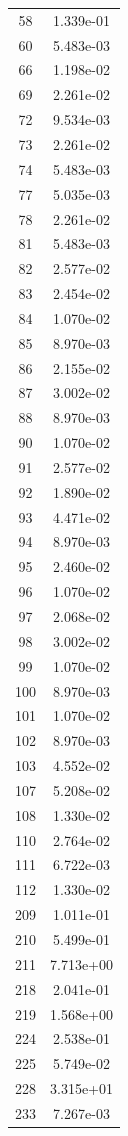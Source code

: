 \documentclass[12pt]{article}
\begin{document}
\begin{longtable}{@{}cc@{}}
58 & 1.339e-01 \\
60 & 5.483e-03 \\
66 & 1.198e-02 \\
69 & 2.261e-02 \\
72 & 9.534e-03 \\
73 & 2.261e-02 \\
74 & 5.483e-03 \\
77 & 5.035e-03 \\
78 & 2.261e-02 \\
81 & 5.483e-03 \\
82 & 2.577e-02 \\
83 & 2.454e-02 \\
84 & 1.070e-02 \\
85 & 8.970e-03 \\
86 & 2.155e-02 \\
87 & 3.002e-02 \\
88 & 8.970e-03 \\
90 & 1.070e-02 \\
91 & 2.577e-02 \\
92 & 1.890e-02 \\
93 & 4.471e-02 \\
94 & 8.970e-03 \\
95 & 2.460e-02 \\
96 & 1.070e-02 \\
97 & 2.068e-02 \\
98 & 3.002e-02 \\
99 & 1.070e-02 \\
100 & 8.970e-03 \\
101 & 1.070e-02 \\
102 & 8.970e-03 \\
103 & 4.552e-02 \\
107 & 5.208e-02 \\
108 & 1.330e-02 \\
110 & 2.764e-02 \\
111 & 6.722e-03 \\
112 & 1.330e-02 \\
209 & 1.011e-01 \\
210 & 5.499e-01 \\
211 & 7.713e+00 \\
218 & 2.041e-01 \\
219 & 1.568e+00 \\
224 & 2.538e-01 \\
225 & 5.749e-02 \\
228 & 3.315e+01 \\
233 & 7.267e-03 \\

\end{longtable}
\end{document}
